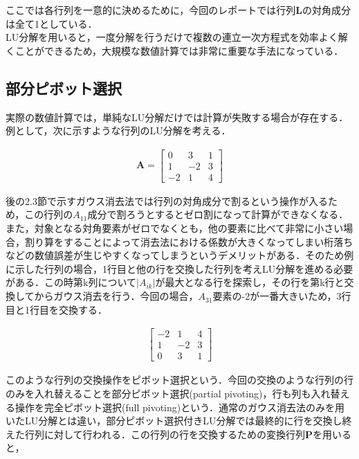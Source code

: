 \documentclass[dvipdfmx]{jsarticle}
\begin{document}
ここでは各行列を一意的に決めるために，今回のレポートでは行列$\boldsymbol{L}$の対角成分は全て1としている．\\

LU分解を用いると，一度分解を行うだけで複数の連立一次方程式を効率よく解くことができるため，大規模な数値計算では非常に重要な手法になっている．\\

\subsection{部分ピボット選択}
実際の数値計算では，単純なLU分解だけでは計算が失敗する場合が存在する．例として，次に示すような行列のLU分解を考える．

\begin{align*}
    \boldsymbol{A}=
    \begin{bmatrix}
        0 & 3 & 1 \\
        1 & -2 & 3 \\
        -2 & 1 & 4
    \end{bmatrix}
\end{align*}

後の2.3節で示すガウス消去法では行列の対角成分で割るという操作が入るため，この行列の$A_{11}$成分で割ろうとするとゼロ割になって計算ができなくなる．また，対象となる対角要素がゼロでなくとも，他の要素に比べて非常に小さい場合，割り算をすることによって消去法における係数が大きくなってしまい桁落ちなどの数値誤差が生じやすくなってしまうというデメリットがある．そのため例に示した行列の場合，1行目と他の行を交換した行列を考えLU分解を進める必要がある．この時第k列について$\left|A_{ik}\right|$が最大となる行を探索し，その行を第k行と交換してからガウス消去を行う．今回の場合，$A_{31}$要素の-2が一番大きいため，3行目と1行目を交換する．

\begin{align*}
    \begin{bmatrix}
        -2 & 1 & 4 \\
        1 & -2 & 3 \\
        0 & 3 & 1
    \end{bmatrix}
\end{align*}

このような行列の交換操作をピボット選択という．今回の交換のような行列の行のみを入れ替えることを部分ピボット選択(partial pivoting)，行も列も入れ替える操作を完全ピボット選択(full pivoting)という．通常のガウス消去法のみを用いたLU分解とは違い，部分ピボット選択付きLU分解では最終的に行を交換し終えた行列に対して行われる．この行列の行を交換するための変換行列$\boldsymbol{P}$を用いると，
\end{document}
